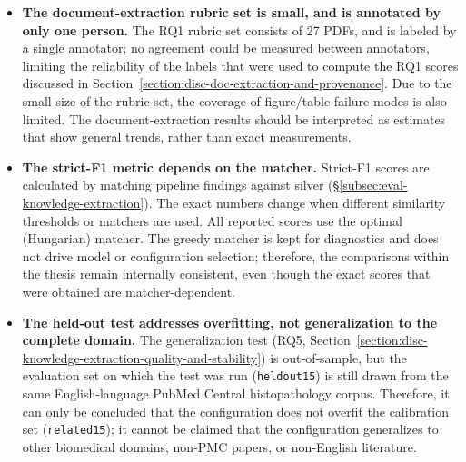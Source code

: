 \begin{itemize}[label={},leftmargin=1.5em]
    \item \textbf{The document-extraction rubric set is small, and is annotated by only one person.} The RQ1 rubric set consists of 27 PDFs, and is labeled by a single annotator; no agreement could be measured between annotators, limiting the reliability of the labels that were used to compute the RQ1 scores discussed in Section~\ref{section:disc-doc-extraction-and-provenance}. Due to the small size of the rubric set, the coverage of figure/table failure modes is also limited. The document-extraction results should be interpreted as estimates that show general trends, rather than exact measurements.

    \item \textbf{The strict-F1 metric depends on the matcher.} Strict-F1 scores are calculated by matching pipeline findings against silver (§\ref{subsec:eval-knowledge-extraction}). The exact numbers change when different similarity thresholds or matchers are used. All reported scores use the optimal (Hungarian) matcher. The greedy matcher is kept for diagnostics and does not drive model or configuration selection; therefore, the comparisons within the thesis remain internally consistent, even though the exact scores that were obtained are matcher-dependent.

    \item \textbf{The held-out test addresses overfitting, not generalization to the complete domain.} The generalization test (RQ5, Section~\ref{section:disc-knowledge-extraction-quality-and-stability}) is out-of-sample, but the evaluation set on which the test was run (\texttt{heldout15}) is still drawn from the same English-language PubMed Central histopathology corpus. Therefore, it can only be concluded that the configuration does not overfit the calibration set (\texttt{related15}); it cannot be claimed that the configuration generalizes to other biomedical domains, non-PMC papers, or non-English literature.
    
\end{itemize}